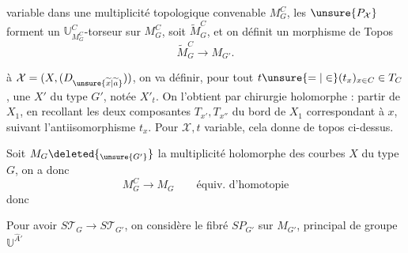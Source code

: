 variable dans une multiplicité topologique convenable $M_G^C$, les $\unsure{P_{\mathcal{X}}}$ forment un $\mathbb{U}_{M_G^C}^{C}$-torseur sur $M_G^C$, soit $\widetilde{M}_G^C$, et on définit un  morphisme de Topos
\[
\widetilde{M}_G^C\longrightarrow M_{G'}.
\]

 à $\mathcal{X}=(X,(D_{\unsure{\widetilde x|\widetilde a}}))$,  on va définir, pour tout $t\unsure{=|\in}(t_x)_{x\in C}\in T_C$, une  $X'$ du type $G'$, notée $X'_t$. On l'obtient par chirurgie holomorphe : partir de $X_1$, en recollant  les deux composantes  $T_{x'},T_{x''}$ du bord de $X_1$ correspondant à $x$, suivant l'antiisomorphisme $t_x$. Pour $\mathcal{X},t$ variable, cela donne  de topos ci-dessus.

Soit $M_G\deleted{_{\unsure{G'}}}$  la multiplicité holomorphe des courbes $X$ du type $G$, on a donc
\[
M_G^C\longrightarrow M_G\qquad\text{équiv. d'homotopie}
\]
donc

Pour avoir $S\mathcal{T}_G\longrightarrow S\mathcal{T}_{G'}$, on considère le fibré $SP_{G'}$ sur $M_{G'}$, principal de groupe $\mathbb{U}^{\widehat{A}'}$
